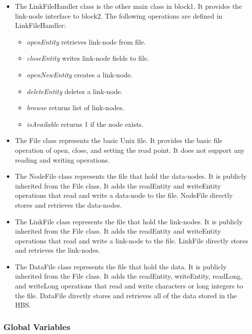 \begin{itemize}
\item The LinkFileHandler class is the other main class in block1.  It
provides the link-node interface to block2.  The following operations are
defined in LinkFileHandler:

\begin{itemize}

  \item{\em openEntity} retrieves link-node from file.
  \item{\em closeEntity} writes link-node fields to file.
  \item{\em openNewEntity} creates a link-node.
  \item{\em deleteEntity} deletes a link-node.
  \item{\em browse} returns list of link-nodes.
  \item{\em isAvailable} returns 1 if the node exists.
  \end{itemize}

\item The File class represents the basic Unix file.  It provides the basic
  file operation of open, close, and setting the read point.  It does not
  support any reading and writing operations.

\item The NodeFile class represents the file that hold the data-nodes.  It
is publicly inherited from the File class.  It adds the readEntity and
writeEntity operations that read and write a data-node to the file.  NodeFile
directly stores and retrieves the data-nodes.

\item The LinkFile class represents the file that hold the link-nodes.  It
is publicly inherited from the File class.  It adds the readEntity and
writeEntity operations that read and write a link-node to the file.  LinkFile
directly stores and retrieves the link-nodes.

\item The DataFile class represents the file that hold the data.  It
is publicly inherited from the File class.  It adds the readEntity,
writeEntity, readLong, and writeLong operations that read and write
characters or long integers to the file. DataFile directly stores and retrieves
all of the data stored in the HBS.

\end{itemize}

\subsubsection*{Global Variables}

